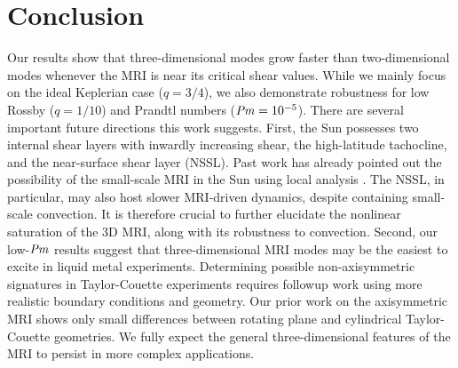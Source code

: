 \documentclass[openacc]{rsproca_new}%
\newcommand{\Prm}{\mbox{\textit{Pm}}}
\begin{document}
\section{Conclusion}
\label{sec:conclusion}

Our results show that three-dimensional modes grow faster than two-dimensional modes whenever the MRI is near its critical shear values.
While we mainly focus on the ideal Keplerian case ($q=3/4$), we also demonstrate robustness for low Rossby ($q=1/10$) and Prandtl numbers ($\Prm=10^{-5}$).
There are several important future directions this work suggests.
First, the Sun possesses two internal shear layers with inwardly increasing shear, the high-latitude tachocline, and the near-surface shear layer (NSSL). 
Past work has already pointed out the possibility of the small-scale MRI in the Sun using local analysis \cite{2007ApJ...667L.207P,2011MNRAS.411L..26M,2014ApJ...787...21K}.
The NSSL, in particular, may also host slower MRI-driven dynamics, despite containing small-scale convection.
It is therefore crucial to further elucidate the nonlinear saturation of the 3D MRI, along with its robustness to convection.
Second, our low-$\Prm$ results suggest that three-dimensional MRI modes may be the easiest to excite in liquid metal experiments.
Determining possible non-axisymmetric signatures in Taylor-Couette experiments requires followup work using more realistic boundary conditions and geometry. 
Our prior work on the axisymmetric MRI \cite{2017ApJ...841....1C,2017ApJ...841....2C} shows only small differences between rotating plane and cylindrical Taylor-Couette geometries. 
We fully expect the general three-dimensional features of the MRI to persist in more complex applications. 










\end{document}
